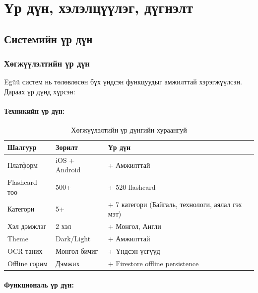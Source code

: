 
\section{Үр дүн, хэлэлцүүлэг, дүгнэлт}
\label{sec:results-conclusion}

\subsection{Системийн үр дүн}
\label{subsec:system-results}

\subsubsection{Хөгжүүлэлтийн үр дүн}

Egüü систем нь төлөвлөсөн бүх үндсэн функцуудыг амжилттай хэрэгжүүлсэн. Дараах үр дүнд хүрсэн:

\paragraph{Техникийн үр дүн:}

\begin{table}[H]
\centering
\caption{Хөгжүүлэлтийн үр дүнгийн хураангуй}
\label{tab:development-results}
\begin{tabular}{|l|l|l|}
\hline
\textbf{Шалгуур} & \textbf{Зорилт} & \textbf{Үр дүн} \\
\hline
Платформ & iOS + Android & + Амжилттай \\
\hline
Flashcard тоо & 500+ & + 520 flashcard \\
\hline
Категори & 5+ & + 7 категори (Байгаль, технологи, аялал гэх мэт) \\
\hline
Хэл дэмжлэг & 2 хэл & + Монгол, Англи \\
\hline
Theme & Dark/Light & + Амжилттай \\
\hline
OCR таних & Монгол бичиг & + Үндсэн үсгүүд \\
\hline
Offline горим & Дэмжих & + Firestore offline persistence \\
\hline
\end{tabular}
\end{table}

\paragraph{Функциональ үр дүн:}

